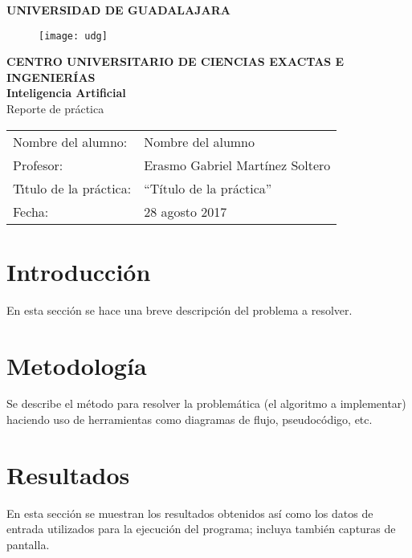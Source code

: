 \documentclass[11pt]{article}
\newcommand{\elalumno}{Nombre del alumno}
\newcommand{\director}{Erasmo Gabriel Martínez Soltero}
\newcommand{\fecha}{28 agosto 2017}
\newcommand{\tituloPractica}{Título de la práctica}
\begin{document}
\begin{center}
  {\Large \textbf{UNIVERSIDAD DE GUADALAJARA}}\\
  \begin{figure} [H]
	\begin{center}
  		\texttt{[image: udg]}
	\end{center}
  \end{figure}
  {\large \textbf{CENTRO UNIVERSITARIO DE CIENCIAS EXACTAS E INGENIERÍAS}}\\
  \vspace{0.25cm}
{\large \textbf{Inteligencia Artificial}}\\
\vspace{0.25cm}
\vspace{0.5cm}
{\large Reporte de práctica} \vspace{1cm} \\

\begin{tabular}{p{4cm}p{8cm}}
Nombre del alumno: & \elalumno \\
Profesor: & \director \\
T\'\i tulo de la práctica: &
``{\tituloPractica}'' \\
Fecha: & \fecha
\end{tabular}
\end{center}
\section*{Introducción}

En esta sección se hace una breve descripción del problema a resolver.

\section*{Metodología}

Se describe el método para resolver la problemática (el algoritmo a implementar) haciendo uso de herramientas como diagramas de flujo, pseudocódigo, etc.

\section*{Resultados}

En esta sección se muestran los resultados obtenidos así como los datos de entrada utilizados para la ejecución del programa; incluya también capturas de pantalla.
\end{document}
